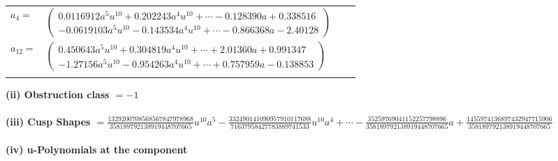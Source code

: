 \documentclass[1p]{elsarticle_modified}
\theoremstyle{definition}
\begin{document}
\begin{tabular}{m{7pt} m{180pt} m{7pt} m{180pt} }
\flushright $a_{4}=$&$\begin{pmatrix}0.0116912 a^{5} u^{10}+0.202243 a^{4} u^{10}+\cdots-0.128390 a+0.338516\\-0.0619103 a^{5} u^{10}-0.143534 a^{4} u^{10}+\cdots-0.866368 a-2.40128\end{pmatrix}$ \\
\flushright $a_{12}=$&$\begin{pmatrix}0.450643 a^{5} u^{10}+0.304819 a^{4} u^{10}+\cdots+2.01360 a+0.991347\\-1.27156 a^{5} u^{10}-0.954263 a^{4} u^{10}+\cdots+0.757959 a-0.138853\end{pmatrix}$\\&\end{tabular}
\flushleft \textbf{(ii) Obstruction class $= -1$}\\~\\
\flushleft \textbf{(iii) Cusp Shapes $= \frac{1329200708568567847978968}{358189792138919448707665} u^{10} a^5-\frac{332490141090957910117688}{71637958427783889741533} u^{10} a^4+\cdots-\frac{35259769041152257798896}{358189792138919448707665} a+\frac{1455974136897432947715906}{358189792138919448707665}$}\\~\\
\newpage\renewcommand{\arraystretch}{1}
\flushleft \textbf{(iv) u-Polynomials at the component}\newline \\
\end{document}
